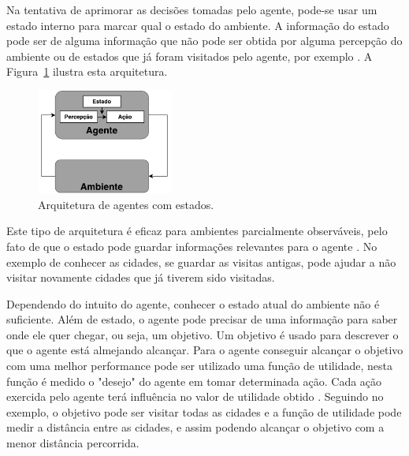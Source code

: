 Na tentativa de aprimorar as decisões tomadas pelo agente, pode-se usar um estado interno para marcar qual o estado do ambiente. A informação do estado pode ser de alguma informação que não pode ser obtida por alguma percepção do ambiente ou de estados que já foram visitados pelo agente, por exemplo \cite{intelligence2003modern}. A Figura~\ref{fig:agenteModelbased} ilustra esta arquitetura. 

\begin{figure}[ht]
	\centering
	\includegraphics[width=0.4\textwidth]{fig/agentModel.pdf}
	\caption{Arquitetura de agentes com estados.}
	\label{fig:agenteModelbased}
\end{figure} 

Este tipo de arquitetura é eficaz para ambientes parcialmente observáveis, pelo fato de que o estado pode guardar informações relevantes para o agente \cite{intelligence2003modern}. No exemplo de conhecer as cidades, se guardar as visitas antigas, pode ajudar a não visitar novamente cidades que já tiverem sido visitadas. 

Dependendo do intuito do agente, conhecer o estado atual do ambiente não é suficiente. Além de estado, o agente pode precisar de uma informação para saber onde ele quer chegar, ou seja, um objetivo. Um objetivo é usado para descrever o que o agente está almejando alcançar. Para o agente conseguir alcançar o objetivo com uma melhor performance pode ser utilizado uma função de utilidade, nesta função é medido o "desejo" do agente em tomar determinada ação. Cada ação exercida pelo agente terá influência no valor de utilidade obtido \cite{intelligence2003modern}. Seguindo no exemplo, o objetivo pode ser visitar todas as cidades e a função de utilidade pode medir a distância entre as cidades, e assim podendo alcançar o objetivo com a menor distância percorrida. 



